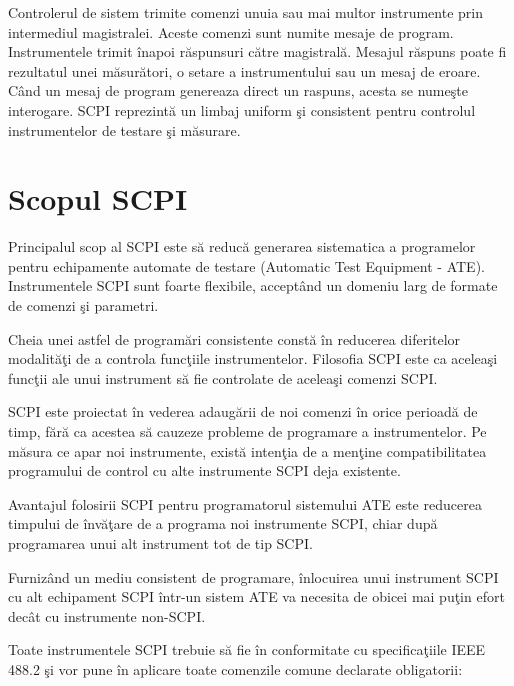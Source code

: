 Controlerul de sistem trimite comenzi unuia sau mai multor instrumente prin intermediul magistralei. Aceste comenzi sunt numite mesaje de program. Instrumentele trimit \^{i}napoi r\u{a}spunsuri c\u{a}tre magistral\u{a}. Mesajul r\u{a}spuns poate fi rezultatul unei m\u{a}sur\u{a}tori, o setare a instrumentului sau un mesaj de eroare. C\^{a}nd un mesaj de program genereaza direct un raspuns, acesta se nume\c{s}te interogare. SCPI reprezint\u{a} un limbaj uniform \c{s}i consistent pentru controlul instrumentelor de testare \c{s}i m\u{a}surare.

\section{Scopul SCPI}
Principalul scop al SCPI este s\u{a} reduc\u{a} generarea sistematica a programelor pentru echipamente automate de testare (Automatic Test Equipment - ATE). Instrumentele SCPI sunt foarte flexibile, accept\^{a}nd un domeniu larg de formate de comenzi \c{s}i parametri.

Cheia unei astfel de program\u{a}ri consistente const\u{a} \^{i}n reducerea diferitelor modalit\u{a}\c{t}i de a controla func\c{t}iile instrumentelor. Filosofia SCPI este ca acelea\c{s}i func\c{t}ii ale unui instrument s\u{a} fie controlate de acelea\c{s}i comenzi SCPI.

SCPI este proiectat \^{i}n vederea adaug\u{a}rii de noi comenzi \^{i}n orice perioad\u{a} de timp, f\u{a}r\u{a} ca acestea s\u{a} cauzeze probleme de programare a instrumentelor. Pe m\u{a}sura ce apar noi instrumente, exist\u{a} inten\c{t}ia de a men\c{t}ine compatibilitatea programului de control cu alte instrumente SCPI deja existente.

Avantajul folosirii SCPI pentru programatorul sistemului ATE este reducerea timpului de \^{i}nv\u{a}\c{t}are de a programa noi instrumente SCPI, chiar dup\u{a} programarea unui alt instrument tot de tip SCPI.

Furniz\^{a}nd un mediu consistent de programare, \^{i}nlocuirea unui instrument SCPI cu alt echipament SCPI \^{i}ntr-un sistem ATE va necesita de obicei mai pu\c{t}in efort dec\^{a}t cu instrumente non-SCPI.

Toate instrumentele SCPI trebuie s\u{a} fie \^{i}n conformitate cu specifica\c{t}iile IEEE 488.2 \c{s}i vor pune \^{i}n aplicare toate comenzile comune declarate obligatorii:

